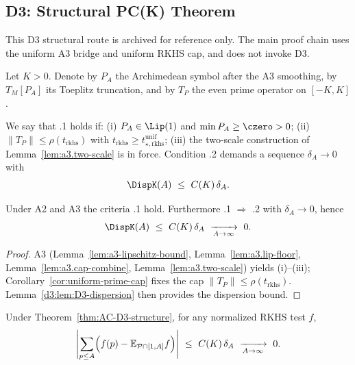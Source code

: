 \subsection{D3: Structural PC(K) Theorem}\label{d3:sec:D3-structural}
\begin{remark}
This D3 structural route is archived for reference only. The main proof chain uses the uniform A3 bridge and uniform RKHS cap, and does not invoke D3.
\end{remark}

\begin{definition}\label{def:D3-setup}
Let $K>0$.  Denote by $P_A$ the Archimedean symbol after the A3 smoothing, by $T_M[P_A]$ its Toeplitz truncation, and by $T_P$ the even prime operator on $[-K,K]$.
\end{definition}

\begin{definition}\label{def:AC-D3}
We say that \ACDthree.1 holds if: (i) $P_A\in\Lip(1)$ and $\min P_A\ge \czero>0$; (ii) $\|T_P\|\le \rho(t_{\mathrm{rkhs}})$ with $t_{\mathrm{rkhs}}\ge t_{\star,\mathrm{rkhs}}^{\mathrm{unif}}$; (iii) the two-scale construction of Lemma~\ref{lem:a3.two-scale} is in force.  Condition \ACDthree.2 demands a sequence $\delta_A\to0$ with
\[
  \DispK(A)\ \le\ C(K)\,\delta_A.
\]
\end{definition}

\begin{theorem}\label{thm:AC-D3-structure}
Under A2 and A3 the criteria \ACDthree.1 hold. Furthermore \ACDthree.1 $\Rightarrow$ \ACDthree.2 with $\delta_A\to0$, hence
\[
  \DispK(A)\ \le\ C(K)\,\delta_A\ \xrightarrow[A\to\infty]{}\ 0.
\]
\end{theorem}
\begin{proof}
A3 (Lemma~\ref{lem:a3-lipschitz-bound}, Lemma~\ref{lem:a3.lip-floor}, Lemma~\ref{lem:a3.cap-combine}, Lemma~\ref{lem:a3.two-scale}) yields (i)--(iii); Corollary~\ref{cor:uniform-prime-cap} fixes the cap $\|T_P\|\le\rho(t_{\mathrm{rkhs}})$.  Lemma~\ref{d3:lem:D3-dispersion} then provides the dispersion bound.
\end{proof}

\begin{corollary}[D3-lock]\label{d3:cor:D3-lock}
Under Theorem~\ref{thm:AC-D3-structure}, for any normalized RKHS test $f$,
\[
  \Biggl|\sum_{p\le A}\Bigl(f(p)-\mathbb{E}_{\mathcal{P}\cap[1,A]}f\Bigr)\Biggr|\ \le\ C(K)\,\delta_A\ \xrightarrow[A\to\infty]{}\ 0.
\]
\end{corollary}
